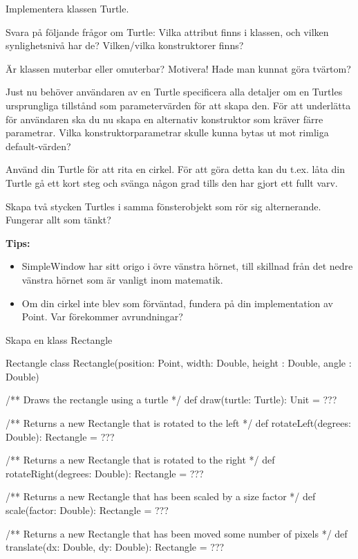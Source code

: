 \Subtask Implementera klassen Turtle.

\Subtask Svara på följande frågor om Turtle: Vilka attribut finns i klassen, och vilken synlighetsnivå har de? Vilken/vilka konstruktorer finns? 

\Subtask Är klassen muterbar eller omuterbar? Motivera! Hade man kunnat göra tvärtom?

\Subtask Just nu behöver användaren av en Turtle specificera alla detaljer om en Turtles ursprungliga tillstånd som parametervärden för att skapa den. För att underlätta för användaren ska du nu skapa en alternativ konstruktor som kräver färre parametrar. Vilka konstruktorparametrar skulle kunna bytas ut mot rimliga default-värden?

\Subtask Använd din Turtle för att rita en cirkel. För att göra detta kan du t.ex. låta din Turtle gå ett kort steg och svänga någon grad tills den har gjort ett fullt varv.

\Subtask Skapa två stycken Turtles i samma fönsterobjekt som rör sig alternerande. Fungerar allt som tänkt?

\textbf{Tips:}
\begin{itemize}
\item SimpleWindow har sitt origo i övre vänstra hörnet, till skillnad från det nedre vänstra hörnet som är vanligt inom matematik.
\item Om din cirkel inte blev som förväntad, fundera på din implementation av Point. Var förekommer avrundningar?
\end{itemize}

\Task Skapa en klass Rectangle
\begin{ScalaSpec}{Rectangle}
class Rectangle(position: Point, width: Double, height : Double, angle : Double) {
  /** Draws the rectangle using a turtle */
  def draw(turtle: Turtle): Unit = ???

  /** Returns a new Rectangle that is rotated to the left */
  def rotateLeft(degrees: Double): Rectangle = ???

  /** Returns a new Rectangle that is rotated to the right */
  def rotateRight(degrees: Double): Rectangle = ???

  /** Returns a new Rectangle that has been scaled by a size factor */
  def scale(factor: Double): Rectangle = ???

  /** Returns a new Rectangle that has been moved some number of pixels */
  def translate(dx: Double, dy: Double): Rectangle = ???
}
\end{ScalaSpec}

